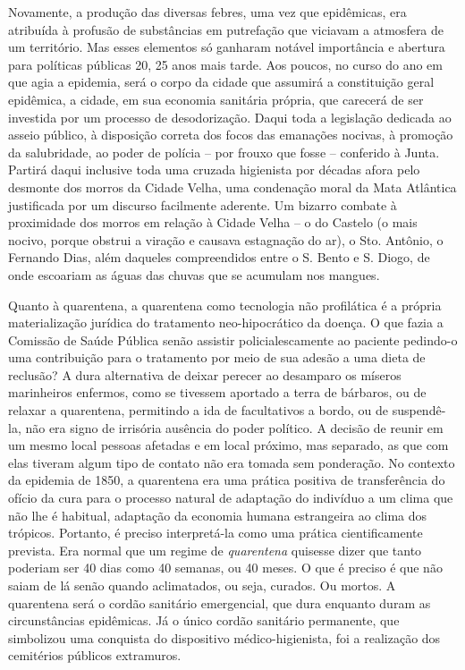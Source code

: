 Novamente, a produção das diversas febres, uma vez que epidêmicas, era
atribuída à profusão de substâncias em putrefação que viciavam a
atmosfera de um território. Mas esses elementos só ganharam notável
importância e abertura para políticas públicas 20, 25 anos mais tarde.
Aos poucos, no curso do ano em que agia a epidemia, será o corpo da
cidade que assumirá a constituição geral epidêmica, a cidade, em sua
economia sanitária própria, que carecerá de ser investida por um
processo de desodorização. Daqui toda a legislação dedicada ao asseio
público, à disposição correta dos focos das emanações nocivas, à
promoção da salubridade, ao poder de polícia -- por frouxo que fosse --
conferido à Junta. Partirá daqui inclusive toda uma cruzada higienista
por décadas afora pelo desmonte dos morros da Cidade Velha, uma
condenação moral da Mata Atlântica justificada por um discurso
facilmente aderente. Um bizarro combate à proximidade dos morros em
relação à Cidade Velha -- o do Castelo (o mais nocivo, porque obstrui a
viração e causava estagnação do ar), o Sto. Antônio, o Fernando Dias,
além daqueles compreendidos entre o S. Bento e S. Diogo, de onde
escoariam as águas das chuvas que se acumulam nos mangues.

Quanto à quarentena, a quarentena como tecnologia não profilática é a
própria materialização jurídica do tratamento neo-hipocrático da doença.
O que fazia a Comissão de Saúde Pública senão assistir policialescamente
ao paciente pedindo-o uma contribuição para o tratamento por meio de sua
adesão a uma dieta de reclusão? A dura alternativa de deixar perecer ao
desamparo os míseros marinheiros enfermos, como se tivessem aportado a
terra de bárbaros, ou de relaxar a quarentena, permitindo a ida de
facultativos a bordo, ou de suspendê-la, não era signo de irrisória
ausência do poder político. A decisão de reunir em um mesmo local
pessoas afetadas e em local próximo, mas separado, as que com elas
tiveram algum tipo de contato não era tomada sem ponderação. No contexto
da epidemia de 1850, a quarentena era uma prática positiva de
transferência do ofício da cura para o processo natural de adaptação do
indivíduo a um clima que não lhe é habitual, adaptação da economia
humana estrangeira ao clima dos trópicos. Portanto, é preciso
interpretá-la como uma prática cientificamente prevista. Era normal que
um regime de \emph{quarentena} quisesse dizer que tanto poderiam ser 40
dias como 40 semanas, ou 40 meses. O que é preciso é que não saiam de lá
senão quando aclimatados, ou seja, curados. Ou mortos. A quarentena será
o cordão sanitário emergencial, que dura enquanto duram as
circunstâncias epidêmicas. Já o único cordão sanitário permanente, que
simbolizou uma conquista do dispositivo médico-higienista, foi a
realização dos cemitérios públicos extramuros.

